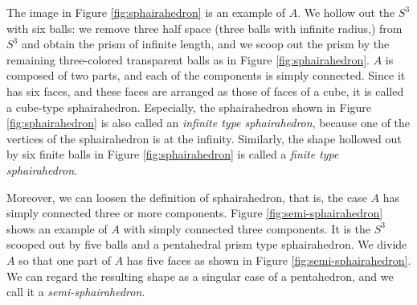 The image in Figure \ref{fig:sphairahedron}
is an example of $A$.
We hollow out the $S^3$ with six balls: we remove three half space
(three balls with infinite radius,) from $S^3$ and obtain the prism of
infinite length, and we scoop out the prism by the remaining
three-colored transparent balls as in Figure \ref{fig:sphairahedron}.
$A$ is composed of two parts, and each of the components is simply connected.
Since it has six faces, and these faces are arranged as those of faces of
a cube, it is called a cube-type sphairahedron.
Especially, the sphairahedron shown in Figure \ref{fig:sphairahedron}
is also called an \textit{infinite type sphairahedron},
because one of the vertices of the sphairahedron is at the infinity.
Similarly, the shape hollowed out by six finite balls in Figure
\ref{fig:sphairahedron} is called a
\textit{finite type sphairahedron}.

Moreover, we can loosen the definition of sphairahedron,
that is, the case $A$ has simply connected three or more components.
Figure \ref{fig:semi-sphairahedron} shows an
example of $A$ with simply connected three components.
It is the $S^3$ scooped out by five balls and a pentahedral prism type
sphairahedron.
We divide $A$ so that one part of $A$ has five faces as shown in
Figure \ref{fig:semi-sphairahedron}.
We can regard the resulting shape as a singular case of a pentahedron,
and we call it a \textit{semi-sphairahedron}.

